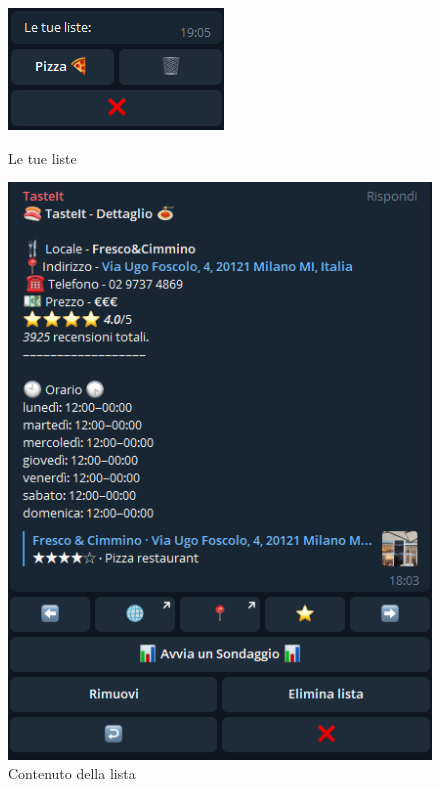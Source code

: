 \documentclass[a4paper, 12pt]{article}
\begin{document}
	\begin{figure}[!htb]
		\begin{minipage}{0.45\textwidth}
			\centering
			\includegraphics[width=\linewidth]{preferitiCommand_listOfLists.png}
			\caption{Le tue liste}
		\end{minipage}\hfill
		\begin{minipage}{0.45\textwidth}
			\centering
			\includegraphics[width=\linewidth]{preferitiCommand_listContent.png}
			\caption{Contenuto della lista}
		\end{minipage}
	\end{figure}
\end{document}

